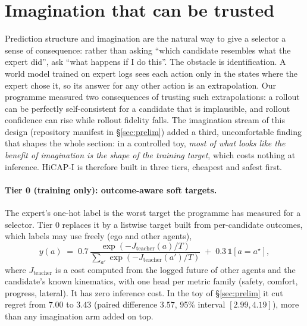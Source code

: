\section{Imagination that can be trusted}\label{sec:imag}
Prediction structure and imagination are the natural way to give a selector a sense of consequence: rather than asking ``which candidate resembles what the expert did'', ask ``what happens if I do this''.
The obstacle is identification. A world model trained on expert logs sees each action only in the states where the expert chose it, so its answer for any other action is an extrapolation.
Our programme measured two consequences of trusting such extrapolations: a rollout can be perfectly self-consistent for a candidate that is implausible, and rollout confidence can rise while rollout fidelity falls\evI.
The imagination stream of this design (repository manifest in \S\ref{sec:prelim}) added a third, uncomfortable finding that shapes the whole section: in a controlled toy, \emph{most of what looks like the benefit of imagination is the shape of the training target}, which costs nothing at inference. HiCAP-I is therefore built in three tiers, cheapest and safest first.

\paragraph{Tier 0 (training only): outcome-aware soft targets.}
The expert's one-hot label is the worst target the programme has measured for a selector\evI. Tier 0 replaces it by a listwise target built from per-candidate outcomes, which labels may use freely (ego and other agents),
\begin{equation}
y(a)\;=\;0.7\,\frac{\exp(-J_{\text{teacher}}(a)/T)}{\sum_{a'}\exp(-J_{\text{teacher}}(a')/T)}\;+\;0.3\,\mathbb 1[a=a^\star],
\end{equation}
where $J_{\text{teacher}}$ is a cost computed from the logged future of other agents and the candidate's known kinematics, with one head per metric family (safety, comfort, progress, lateral). It has zero inference cost. In the toy of \S\ref{sec:prelim} it cut regret from $7.00$ to $3.43$ (paired difference $3.57$, 95\% interval $[2.99,4.19]$), more than any imagination arm added on top.

